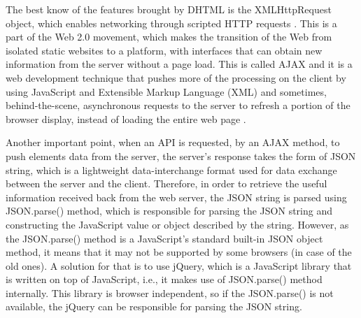 The best know of the features brought by \gls{DHTML} is the XMLHttpRequest object, which enables networking through scripted \gls{HTTP} requests \cite{FLANAGAN:2011}. This is a part of the Web 2.0 movement, which makes the transition of the Web from isolated static websites to a platform, with interfaces that can obtain new information from the server without a page load. This is called \gls{AJAX} and it is a web development technique that pushes more of the processing on the client by using JavaScript and Extensible Markup Language (XML) and sometimes, behind-the-scene, asynchronous requests to the server to refresh a portion of the browser display, instead of loading the entire web page \cite{FELKE-MORRIS:2019}.

Another important point, when an \gls{API} is requested, by an \gls{AJAX} method, to push elements data from the server, the server's response takes the form of \gls{JSON} string, which is a lightweight data-interchange format used for data exchange between the server and the client. Therefore, in order to retrieve the useful information received back from the web server, the \gls{JSON} string is parsed using JSON.parse() method, which is responsible for parsing the \gls{JSON} string and constructing the JavaScript value or object described by the string. However, as the JSON.parse() method is a JavaScript's standard built-in \gls{JSON} object method, it means that it may not be supported by some browsers (in case of the old ones). A solution for that is to use jQuery, which is a JavaScript library that is written on top of JavaScript, i.e., it makes use of JSON.parse() method internally. This library is browser independent, so if the JSON.parse() is not available, the jQuery can be responsible for parsing the JSON string.